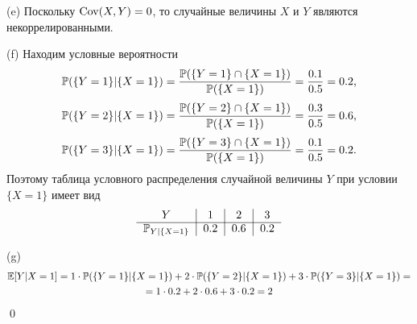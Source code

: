 \documentclass[12pt, a4paper]{article}\usepackage[]{graphicx}\usepackage[]{color}
\begin{document}
				(e) Поскольку $\Cov(X,Y) = 0$, то случайные величины $X$ и $Y$ являются некоррелированными.

				(f) Находим условные вероятности
				\[
				\P(\{Y=1\}|\{X=1\}) = \frac{\P(\{Y=1\} \cap \{X=1\})}{\P(\{X=1\})} = \frac{0.1}{0.5} = 0.2 \text{,}
				\]
				\[
				\P(\{Y=2\}|\{X=1\}) = \frac{\P(\{Y=2\} \cap \{X=1\})}{\P(\{X=1\})} = \frac{0.3}{0.5} = 0.6 \text{,}
				\]
				\[
				\P(\{Y=3\}|\{X=1\}) = \frac{\P(\{Y=3\} \cap \{X=1\})}{\P(\{X=1\})} = \frac{0.1}{0.5} = 0.2 \text{.}
				\]
				Поэтому таблица условного распределения случайной величины $Y$ при условии $\{X = 1\}$ имеет вид
				\[
				\begin{tabular}{c|c|c|c}
				$Y$                          & $1$     & $2$     & $3$ \\ \cline{1-4}
				$\P_{Y|\{X=1\}}$     & $0.2$   & $0.6$   & $0.2$ \\
				\end{tabular}
				\]

				(g)
				\begin{multline}
				\E[Y|{X=1}] = 1 \cdot \P(\{Y=1\}|\{X=1\}) + 2 \cdot \P(\{Y=2\}|\{X=1\}) + 3 \cdot \P(\{Y=3\}|\{X=1\}) = \\
				= 1 \cdot 0.2 + 2 \cdot 0.6 + 3 \cdot 0.2 = 2
				\end{multline}
				\qed
\end{document}
